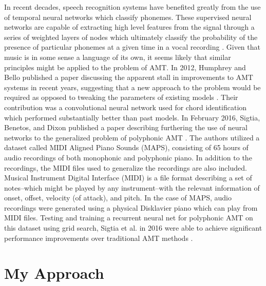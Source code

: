 \documentclass[conference]{IEEEtran}
\begin{document}
In recent decades, speech recognition systems have benefited greatly from the use of temporal neural networks which classify phonemes. These supervised neural networks are capable of extracting high level features from the signal through a series of weighted layers of nodes which ultimately classify the probability of the presence of particular phonemes at a given time in a vocal recording \cite{waibel}. Given that music is in some sense a language of its own, it seems likely that similar principles might be applied to the problem of AMT. In 2012, Humphrey and Bello published a paper discussing the apparent stall in improvements to AMT systems in recent years, suggesting that a new approach to the problem would be required as opposed to tweaking the parameters of existing models \cite{humphrey}. Their contribution was a convolutional neural network used for chord identification which performed substantially better than past models. In February 2016, Sigtia, Benetos, and Dixon published a paper describing furthering the use of neural networks to the generalized problem of polyphonic AMT \cite{sigtia}. The authors utilized a dataset called MIDI Aligned Piano Sounds (MAPS), consisting of 65 hours of audio recordings of both monophonic and polyphonic piano. In addition to the recordings, the MIDI files used to generalize the recordings are also included. Musical Instrument Digital Interface (MIDI) is a file format describing a set of notes--which might be played by any instrument--with the relevant information of onset, offset, velocity (of attack), and pitch. In the case of MAPS, audio recordings were generated using a physical Disklavier piano which can play from MIDI files. Testing and training a recurrent neural net for polyphonic AMT on this dataset using grid search, Sigtia et al. in 2016 were able to achieve significant performance improvements over traditional AMT methods \cite{sigtia}.

\section{My Approach}
\end{document}
